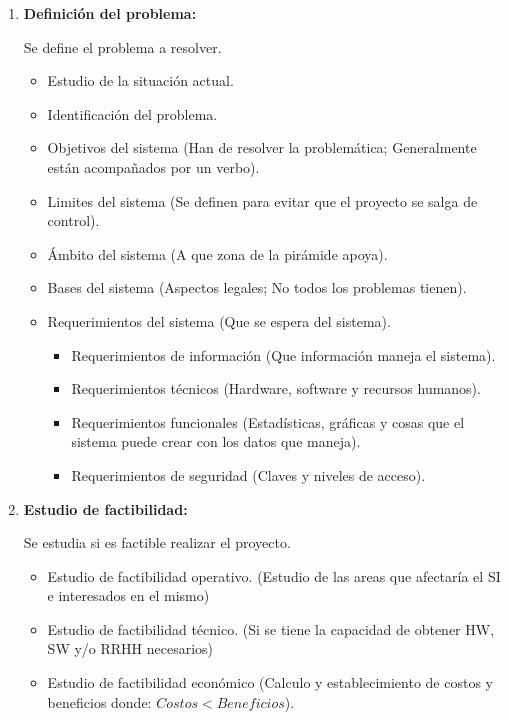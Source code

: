 \documentclass{templateNote}
\begin{document}
\begin{enumerate}
    \item \hypertarget{def_probl}{\textbf{Definición del problema:}} Se define el problema a resolver.
        \begin{itemize}
            \item Estudio de la situación actual.
            \item Identificación del problema.
            \item Objetivos del sistema (Han de resolver la problemática; Generalmente están acompañados por un verbo).
            \item Limites del sistema (Se definen para evitar que el proyecto se salga de control).
            \item Ámbito del sistema (A que zona de la pirámide apoya).
            \item Bases del sistema (Aspectos legales; No todos los problemas tienen).
            \item Requerimientos del sistema (Que se espera del sistema).
                \begin{itemize}
                    \item Requerimientos de información (Que información maneja el sistema).
                    \item Requerimientos técnicos (Hardware, software y recursos humanos).
                    \item Requerimientos funcionales (Estadísticas, gráficas y cosas que el sistema puede crear con los datos que maneja).
                    \item Requerimientos de seguridad (Claves y niveles de acceso).
                \end{itemize}
        \end{itemize}
    \item \hypertarget{est_fac}{\textbf{Estudio de factibilidad:}} Se estudia si es factible realizar el proyecto.
        \begin{itemize}
            \item Estudio de factibilidad operativo. (Estudio de las areas que afectaría el SI e interesados en el mismo)
            \item Estudio de factibilidad técnico. (Si se tiene la capacidad de obtener HW, SW y/o RRHH necesarios)
            \item Estudio de factibilidad económico (Calculo y establecimiento de costos y beneficios donde: $Costos < Beneficios$).
        \end{itemize}

\end{enumerate}
\end{document}
